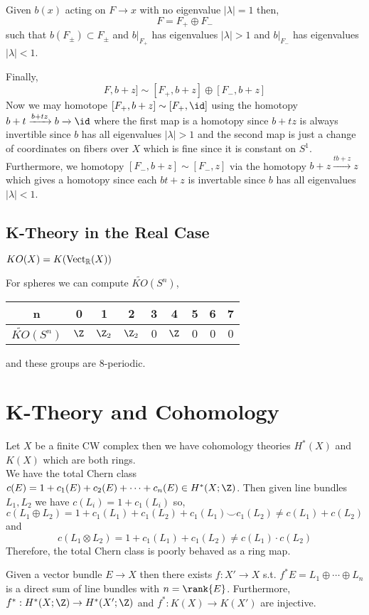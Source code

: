 \documentclass[12pt]{extarticle}
\begin{document}
\begin{lemma}
Given $b(x)$ acting on $F \to x$ with no eigenvalue $|\lambda| = 1$ then,
\[ F = F_{+} \oplus F_{-} \]
such that $b(F_{\pm}) \subset F_{\pm}$ and $b|_{F_{+}}$ has eigenvalues $|\lambda| > 1$ and $b|_{F_{-}}$ has eigenvalues $|\lambda| < 1$. 
\end{lemma}
\noindent
Finally, 
\[ F, b + z] \sim [F_+, b + z] \oplus [F_{-}, b + z] \]
Now we may homotope $[F_+, b + z] \sim [F_+, \id]$ using the homotopy $b + t \xrightarrow{b + t z} b \xrightarrow{} \id$ where the first map is a homotopy since $b + t z$ is always invertible since $b$ has all eigenvalues $|\lambda| > 1$ and the second map is just a change of coordinates on fibers over $X$ which is fine since it is constant on $S^1$. Furthermore, we homotopy $[F_{-}, b + z] \sim [F_{-}, z]$ via the homotopy $b+z \xrightarrow{t b + z} z$ which gives a homotopy since each $b t + z$ is invertable since $b$ has all eigenvalues $|\lambda| < 1$.

\subsection{K-Theory in the Real Case}

\begin{defn}
$KO(X) = K(\mathrm{Vect}_{\mathbb{R}}(X))$
\end{defn}

\begin{example}
For spheres we can compute $\widetilde{KO}(S^n)$,
\begin{center}
\begin{tabular}{ c | c | c | c | c | c | c | c | c }
n & 0 & 1 & 2 & 3 & 4 & 5 & 6 & 7 \\
\hline \hline
$\widetilde{KO}(S^n)$ & $\Z$  & $\Z_2$ & $\Z_2$ & $0$ & $\Z$ & $0$ & $0$ & $0$
\end{tabular}
\end{center}
and these groups are $8$-periodic.
\end{example}

\section{K-Theory and Cohomology}

Let $X$ be a finite CW complex then we have cohomology theories $H^*(X)$ and $K(X)$ which are both rings. 
\bigskip\\
We have the total Chern class $c(E) = 1 + c_1(E) + c_2(E) + \cdots + c_n(E) \in H^*(X; \Z)$. 
Then given line bundles $L_1, L_2$ we have $c(L_i) = 1 + c_1(L_i)$ so,
\[ c(L_1 \oplus L_2) = 1 + c_1(L_1) + c_1(L_2)+ c_1(L_1) \smile c_1(L_2) \neq c(L_1) + c(L_2) \]
and
\[ c(L_1 \otimes L_2) = 1 + c_1(L_1) + c_1(L_2) \neq c(L_1) \cdot c(L_2) \]
Therefore, the total Chern class is poorly behaved as a ring map. 
\bigskip\\
\begin{theorem}[Splitting]
Given a vector bundle $E \to X$ then there exists $f : X' \to X$ s.t. $f^* E = L_1 \oplus \cdots \oplus L_n$ is a direct sum of line bundles with $n = \rank{E}$. Furthermore, $f^* : H^*(X; \Z) \to H^*(X'; \Z)$ and $f^* : K(X) \to K(X')$ are injective. 
\end{theorem}
\end{document}
